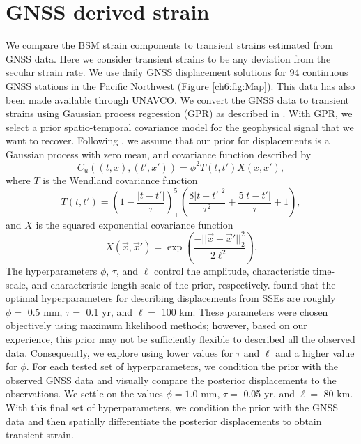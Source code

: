 \section{GNSS derived strain}
We compare the BSM strain components to transient strains estimated
from GNSS data. Here we consider transient strains to be any deviation
from the secular strain rate.  We use daily GNSS displacement
solutions for 94 continuous GNSS stations in the Pacific Northwest
(Figure \ref{ch6:fig:Map}). This data has also been made available through
UNAVCO. We convert the GNSS data to transient strains using Gaussian
process regression (GPR) as described in \citet{Hines2017a}. With GPR,
we select a prior spatio-temporal covariance model for the geophysical
signal that we want to recover. Following \citet{Hines2017a}, we
assume that our prior for displacements is a Gaussian process with
zero mean, and covariance function described by
\begin{equation}\label{cov}
C_u((t,x),(t',x')) = \phi^2 T(t,t')X(x,x'),
\end{equation}        
where $T$ is the Wendland covariance function
\begin{equation}\label{ch6:eq:Wendland}
T(t,t') = \left(1 - \frac{|t - t'|}{\tau}\right)^5_+ \left(\frac{8|t - t'|^2}{\tau^2} + \frac{5|t - t'|}{\tau} + 1\right), 
\end{equation}
and $X$ is the squared exponential covariance function
\begin{equation}\label{ch6:eq:SE}
X(\vec{x},\vec{x}') = \exp\left(\frac{-||\vec{x} - \vec{x}'||_2^2}{2 \ell^2}\right).
\end{equation}
The hyperparameters $\phi$, $\tau$, and $\ell$ control the amplitude,
characteristic time-scale, and characteristic length-scale of the
prior, respectively. \citet{Hines2017a} found that the optimal
hyperparameters for describing displacements from SSEs are roughly
$\phi =$ 0.5 mm, $\tau =$ 0.1 yr, and $\ell =$ 100 km. These
parameters were chosen objectively using maximum likelihood methods;
however, based on our experience, this prior may not be sufficiently
flexible to described all the observed data. Consequently, we explore
using lower values for $\tau$ and $\ell$ and a higher value for
$\phi$. For each tested set of hyperparameters, we condition the prior
with the observed GNSS data and visually compare the posterior
displacements to the observations. We settle on the values $\phi =
1.0$ mm, $\tau =$ 0.05 yr, and $\ell =$ 80 km. With this final set of
hyperparameters, we condition the prior with the GNSS data and then
spatially differentiate the posterior displacements to obtain
transient strain.

